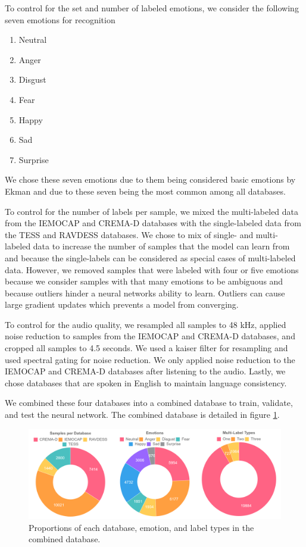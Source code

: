 \documentclass[conference]{IEEEtran}
\begin{document}
To control for the set and number of labeled emotions, we consider the following seven emotions for recognition
\begin{enumerate}
	\item Neutral
	\item Anger
	\item Disgust
	\item Fear
	\item Happy
	\item Sad
	\item Surprise
\end{enumerate}
We chose these seven emotions due to them being considered basic emotions by Ekman \cite{Ekman1992} and due to these seven being the most common among all databases. 

To control for the number of labels per sample, we mixed the multi-labeled data from the IEMOCAP and CREMA-D databases with the single-labeled data from the TESS and RAVDESS databases. We chose to mix of single- and multi- labeled data to increase the number of samples that the model can learn from and because the single-labels can be considered as special cases of multi-labeled data. However, we removed samples that were labeled with four or five emotions because we consider samples with that many emotions to be ambiguous and because outliers hinder a neural networks ability to learn. Outliers can cause large gradient updates which prevents a model from converging.

To control for the audio quality, we resampled all samples to 48 kHz, applied noise reduction to samples from the IEMOCAP and CREMA-D databases, and cropped all samples to 4.5 seconds. We used a kaiser filter for resampling and used spectral gating for noise reduction. We only applied noise reduction to the IEMOCAP and CREMA-D databases after listening to the audio. Lastly, we chose databases that are spoken in English to maintain language consistency.

We combined these four databases into a combined database to train, validate, and test the neural network. The combined database is detailed in figure \ref{combinedDb}.

\begin{figure}[t]
	\centering
	\hspace{6mm}
	\includegraphics[width=\textwidth]{combined_db.png} 
	\caption{Proportions of each database, emotion, and label types in the combined database.}
	\label{combinedDb}
\end{figure}
\end{document}
